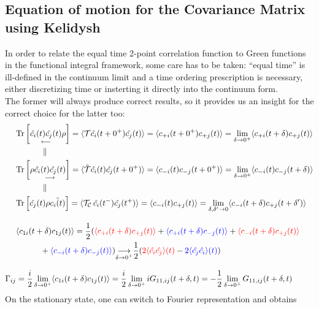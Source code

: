 \documentclass[a4paper,11pt]{article}
\DeclareMathOperator{\Tr}{Tr}
\theoremstyle{remark}
\newcommand{\mean}[1]{\ensuremath{\langle #1 \rangle}}
\newcommand*{\mathcolor}{}  %
\def\mathcolor#1#{\mathcoloraux{#1}}
\newcommand*{\mathcoloraux}[3]{%
  \protect\leavevmode
  \begingroup
    \color#1{#2}#3%
  \endgroup
}
\begin{document}
  \subsection{Equation of motion for the Covariance Matrix using Kelidysh}
  In order to relate the equal time 2-point correlation function to Green functions in the functional integral framework, some care has to be taken: ``equal time'' is ill-defined in the continuum limit and a time ordering prescription is necessary, either discretizing time or insterting it directly into the continuum form. \\ The former will always produce correct results, so it provides us an insight for the correct choice for the latter too:
  \begin{align}
  &\begin{aligned}
   \Tr&\left[ \underset{\mathclap{\longleftarrow}}{\hat{c_i}(t)\hat{c_j}(t)}\rho\right] = \mean{\mathcal{T}\hat{c_i}(t+0^+)\hat{c_j}(t)} = \mean{c_{+i}(t+0^+)c_{+j}(t)} = \lim_{\delta\to 0^+}\mean{c_{+i}(t+\delta)c_{+j}(t)}\\
   &\quad\quad\parallel \\
   \Tr&\left[\rho \underset{\mathclap{\longrightarrow}}{\hat{c_i}(t)\hat{c_j}(t)}\right] = \mean{\tilde{\mathcal{T}}\hat{c_i}(t)\hat{c_j}(t+0^+)} = \mean{c_{-i}(t)c_{-j}(t+0^+)} = \lim_{\delta\to 0^+}\mean{c_{-i}(t)c_{-j}(t+\delta)}\\
   &\quad\quad\parallel\\
   \Tr&\left[\hat{c_j}(t)\rho\hat{c_i(t)}\right] = \mean{\mathcal{T_C}\,\hat{c_i}(t^-)\hat{c_j}(t^+)} = \mean{c_{-i}(t)c_{+j}(t)} =  \lim_{\delta,\delta'\to 0} \mean{c_{-i}(t+\delta)c_{+j}(t+\delta')}
  \end{aligned}\notag\\[0.3 cm]
  &\mean{c_{1i}(t+\delta)c_{1j}(t)} = \frac{1}{2}(\mathcolor{red}{\mean{c_{+i}(t+\delta)c_{+j}(t)}}+\mathcolor{blue}{\mean{c_{+i}(t+\delta)c_{-j}(t)}}+\mathcolor{red}{\mean{c_{-i}(t+\delta)c_{+j}(t)}} \notag\\
  &\quad\quad\quad+\mathcolor{blue}{\mean{c_{-i}(t+\delta)c_{-j}(t)}})\underset{\mathclap{\delta\to0^+}}{\longrightarrow}\frac{1}{2}(\mathcolor{red}{2\mean{\hat{c_i}\hat{c_j}}(t)}-\mathcolor{blue}{2\mean{\hat{c_j}\hat{c_i}}(t)})\notag\\[0.3cm]
  \Gamma_{ij}&=\frac{i}{2}\lim_{\delta\to0^+}\mean{c_{1i}(t+\delta)c_{1j}(t)}=\frac{i}{2}\lim_{\delta\to0^+}iG_{11,ij}(t+\delta,t)=-\frac{1}{2}\lim_{\delta\to0^+}G_{11,ij}(t+\delta,t)
  \end{align}
  On the stationary state, one can switch to Fourier representation and obtains
\end{document}
